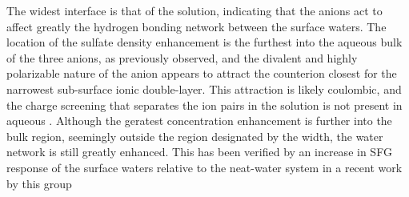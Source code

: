 
The widest interface is that of the \sodsul solution, indicating that the \sul anions act to affect greatly the hydrogen bonding network between the surface waters. The location of the sulfate density enhancement is the furthest into the aqueous bulk of the three anions, as previously observed,\cite{Salvador2003} and the divalent and highly polarizable nature of the anion appears to attract the counterion closest for the narrowest sub-surface ionic double-layer. This attraction is likely coulombic, and the charge screening that separates the ion pairs in the \sodnit solution is not present in aqueous \sodsul. Although the geratest concentration enhancement is further into the bulk region, seemingly outside the region designated by the width, the water network is still greatly enhanced. This has been verified by an increase in SFG response of the surface waters relative to the neat-water system in a recent work by this group\cite{McFearin2009}



